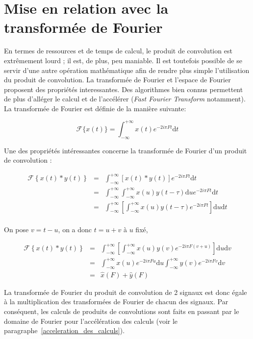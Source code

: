 \section{Mise en relation avec la transformée de Fourier} %

En termes de ressources et de temps de calcul, le produit de convolution est extrêmement lourd ; il est, de plus, peu maniable.
Il est toutefois possible de se servir d'une autre opération mathématique afin de rendre plus simple l'utilisation du produit de convolution.
La transformée de Fourier et l'espace de Fourier proposent des propriétés interessantes. Des algorithmes bien connus permettent de plus d'alléger le calcul et de l'accélérer (\textit{Fast Fourier Transform} notamment).
La transformée de Fourier est définie de la manière suivante:

\begin{equation}
    \mathcal{F}\{x(t)\} = \int_{-\infty}^{+\infty} x(t) e^{-2i\pi Ft} \mathrm dt
\end{equation}

Une des propriétés intéressantes concerne la transformée de Fourier d'un produit de convolution :

\begin{eqnarray*}
    \mathcal{F}\left\{x(t) \ast y(t)\right\} & = & \int_{-\infty}^{+\infty} \left[x(t) \ast y(t)\right] e^{-2i\pi Ft} \mathrm dt \\
    & = & \int_{-\infty}^{+\infty} \int_{-\infty}^{+\infty} x(u)y(t - \tau ) \mathrm du e^{-2i\pi Ft} \mathrm dt \\
    & = & \int_{-\infty}^{+\infty}  \left[ \int_{-\infty}^{+\infty} x(u)y(t - \tau )  e^{-2i\pi Ft} \right] \mathrm du \mathrm dt \\
\end{eqnarray*}

On pose $v= t- u$, on a donc $t= u+v$ à $u$ fixé,

\begin{eqnarray*}
    \mathcal{F}\left\{x(t) \ast y(t)\right\} & = & \int_{-\infty}^{+\infty}  \left[ \int_{-\infty}^{+\infty} x(u)y(v)  e^{-2i\pi F(v+u)} \right] \mathrm du \mathrm dv\\
    & = & \int_{-\infty}^{+\infty}  x(u) e^{-2i\pi Fu}  \mathrm du
    \int_{-\infty}^{+\infty} y(v) e^{-2i\pi Fv} \mathrm dv \\
    & = & \hat{x}(F) + \hat{y}(F)
\end{eqnarray*}

La transformée de Fourier du produit de convolution de 2 signaux est donc égale à la multiplication des transformées de Fourier de chacun des signaux.
Par conséquent, les calculs de produits de convolutions sont faits en passant par le domaine de Fourier pour
l'accélération des calculs (voir le paragraphe~\ref{acceleration_des_calculs}).


